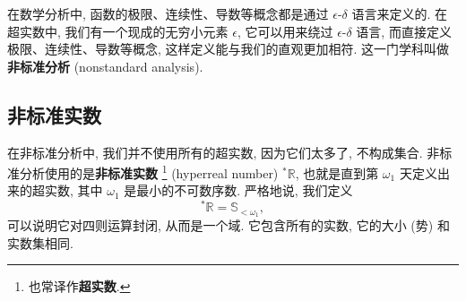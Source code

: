 


在数学分析中, 函数的极限、连续性、导数等概念都是通过 $\epsilon$-$\delta$ 语言来定义的.
在超实数中, 我们有一个现成的无穷小元素 $\epsilon$,
它可以用来绕过 $\epsilon$-$\delta$ 语言, 而直接定义极限、连续性、导数等概念,
这样定义能与我们的直观更加相符.
这一门学科叫做\textbf{非标准分析} (nonstandard analysis).

\subsection{非标准实数}


在非标准分析中,
我们并不使用所有的超实数, 因为它们太多了, 不构成集合.
非标准分析使用的是\textbf{非标准实数}%
\footnote{也常译作\textbf{超实数}.}
(hyperreal number) $^* \mathbb{R}$,
也就是直到第 $\omega_1$ 天定义出来的超实数,
其中 $\omega_1$ 是最小的不可数序数. 严格地说, 我们定义
\[
    ^* \mathbb{R} =
    \mathbb{S}_{< \omega_1},
\]
可以说明它对四则运算封闭,
从而是一个域.
它包含所有的实数,
它的大小 (势) 和实数集相同.




